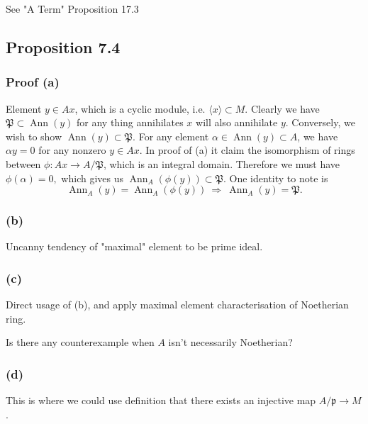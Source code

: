 See "A Term" \cite{altman} Proposition 17.3 

\subsection{Proposition 7.4}

\subsubsection{Proof (a)}
Element $y\in Ax$, which is a cyclic module, i.e. $\langle x\rangle\subset M$.
Clearly we have $\mathfrak P\subset \operatorname{Ann}(y)$ for any thing annihilates $x$ will also annihilate $y$. 
Conversely, we wish to show $\operatorname{Ann}(y)\subset \mathfrak P$. For any element $\alpha\in \operatorname{Ann}(y)\subset A$, we have $\alpha y=0$ for any nonzero $y\in Ax$. In proof of (a) it claim the isomorphism of rings between $\phi:Ax\to A/\mathfrak P$, which is an integral domain. Therefore we must have $\phi(\alpha)=0,$ which gives us $\operatorname{Ann}_A(\phi(y))\subset \mathfrak P$. One identity to note is 
$$\operatorname{Ann}_A(y)=\operatorname{Ann}_A(\phi(y)) ~\Rightarrow~ \operatorname{Ann}_A(y)=\mathfrak P.$$

\subsubsection{(b)}

Uncanny tendency of "maximal" element to be prime ideal.

\subsubsection{(c)}

Direct usage of (b), and apply maximal element characterisation of Noetherian ring.

Is there any counterexample when $A$ isn't necessarily Noetherian?

\subsubsection{(d)}

This is where we could use definition that there exists an injective map $A/\mathfrak p\to M$.